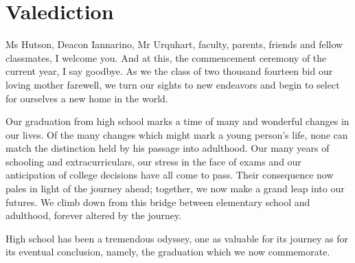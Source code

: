 \documentclass{report}
\begin{document}
\section*{Valediction}

Ms Hutson, Deacon Iannarino, Mr Urquhart, faculty, parents, friends and fellow
classmates, I welcome you. And at this, the commencement ceremony of the
current year, I say goodbye. As we the class of two thousand fourteen bid our
loving mother farewell, we turn our sights to new endeavors and begin to select
for ourselves a new home in the world.

Our graduation from high school marks a time of many and wonderful changes in
our lives. Of the many changes which might mark a young person's life, none can
match the distinction held by his passage into adulthood. Our many years of
schooling and extracurriculars, our stress in the face of exams and our
anticipation of college decisions have all come to pass.  Their consequence now
pales in light of the journey ahead; together, we now make a grand leap into
our futures. We climb down from this bridge between elementary school and
adulthood, forever altered by the journey. 

High school has been a tremendous odyssey, one as valuable for its journey as
for its eventual conclusion, namely, the graduation which we now commemorate.
\end{document}
